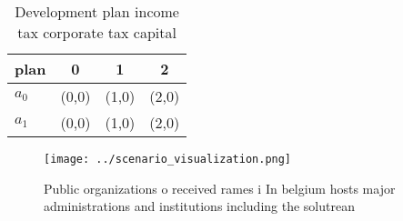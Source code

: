 \documentclass[a4paper]{article}
\begin{document}
\begin{table}
\begin{adjustbox}{width=0.6\columnwidth}
\begin{tabular}{|l|l|l|l|}
\hline
\textbf{plan} & \multicolumn{1}{c|}{\textbf{0}} & \multicolumn{1}{c|}{\textbf{1}} & \multicolumn{1}{c|}{\textbf{2}} \\ \hline
\textbf{$a_0$}  & (0,0) & (1,0) & (2,0) \\ \hline
\textbf{$a_1$}  & (0,0) & (1,0) & (2,0) \\ \hline
\end{tabular}
\end{adjustbox}
\caption{Development plan income tax corporate tax capital
}
\end{table}

\begin{figure}
\centering
\texttt{[image: ../scenario\_visualization.png]}
\caption{Public organizations o received rames i In belgium hosts major administrations and institutions including the solutrean
}
\end{figure}
 
\end{document}
